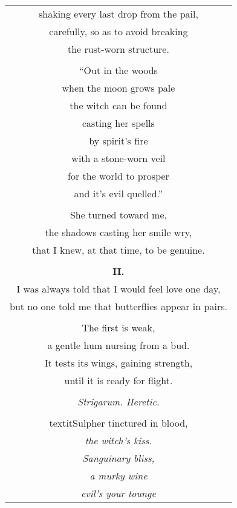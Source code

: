 \documentclass{article}
\begin{document}
\begin{center}
\begin{longtable}{c}
shaking every last drop from the pail, \\
carefully, so as to avoid breaking \\
the rust-worn structure. \\
\\
``Out in the woods \\
when the moon grows pale \\
the witch can be found \\
casting her spells \\
by spirit's fire \\
with a stone-worn veil \\
for the world to prosper \\
and it's evil quelled.'' \\
\\
She turned toward me, \\
the shadows casting her smile wry, \\
that I knew, at that time, to be genuine. \\
\\
\textbf{II.} \\ %
I was always told that I would feel love one day, \\
but no one told me that butterflies appear in pairs. \\
\\
The first is weak, \\
a gentle hum nursing from a bud. \\
It tests its wings, gaining strength, \\
until it is ready for flight. \\
\\
\textit{Strigarum. Heretic.} \\ %
\\textit{Sulpher tinctured in blood,} \\
\textit{the witch's kiss.} \\
\textit{Sanguinary bliss,} \\
\textit{a murky wine} \\
\textit{evil's your tounge} \\

\end{longtable}
\end{center}
\end{document}
